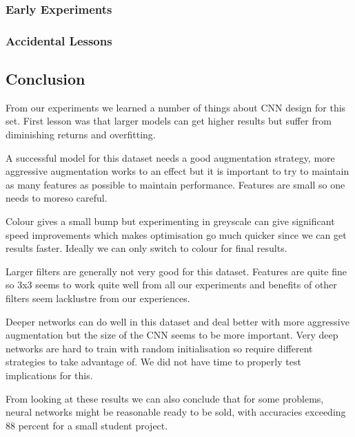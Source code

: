 \subsubsection{Early Experiments}

\subsubsection{Accidental Lessons}


\subsection{Conclusion}
From our experiments we learned a number of things about CNN design for this set. First lesson was that larger models can get higher results but suffer from diminishing returns and overfitting.

A successful model for this dataset needs a good augmentation strategy, more aggressive augmentation works to an effect but it is important to try to maintain as many features as possible to maintain performance. Features are small so one needs to moreso careful.

Colour gives a small bump but experimenting in greyscale can give significant speed improvements which makes optimisation go much quicker since we can get results faster. Ideally we can only switch to colour for final results.

Larger filters are generally not very good for this dataset. Features are quite fine so 3x3 seems to work quite well from all our experiments and benefits of other filters seem lacklustre from our experiences.

Deeper networks can do well in this dataset and deal better with more aggressive augmentation but the size of the CNN seems to be more important. Very deep networks are hard to train with random initialisation so require different strategies to take advantage of. We did not have time to properly test implications for this.

From looking at these results we can also conclude that for some problems, neural networks might be reasonable ready to be sold, with accuracies exceeding 88 percent for a small student project.